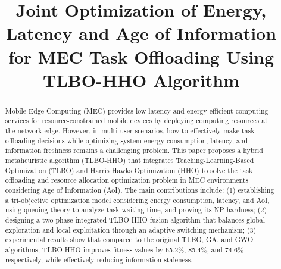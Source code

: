 \documentclass[conference]{IEEEtran}
\begin{document}
\title{Joint Optimization of Energy, Latency and Age of Information for MEC Task Offloading Using TLBO-HHO Algorithm}

\author{
\and
{}
\and
{}
}

\maketitle

\begin{abstract}
Mobile Edge Computing (MEC) provides low-latency and energy-efficient computing services for resource-constrained mobile devices by deploying computing resources at the network edge. However, in multi-user scenarios, how to effectively make task offloading decisions while optimizing system energy consumption, latency, and information freshness remains a challenging problem. This paper proposes a hybrid metaheuristic algorithm (TLBO-HHO) that integrates Teaching-Learning-Based Optimization (TLBO) and Harris Hawks Optimization (HHO) to solve the task offloading and resource allocation optimization problem in MEC environments considering Age of Information (AoI). The main contributions include: (1) establishing a tri-objective optimization model considering energy consumption, latency, and AoI, using queuing theory to analyze task waiting time, and proving its NP-hardness; (2) designing a two-phase integrated TLBO-HHO fusion algorithm that balances global exploration and local exploitation through an adaptive switching mechanism; (3) experimental results show that compared to the original TLBO, GA, and GWO algorithms, TLBO-HHO improves fitness values by 65.2\%, 85.4\%, and 74.6\% respectively, while effectively reducing information staleness.
\end{abstract}
\end{document}
